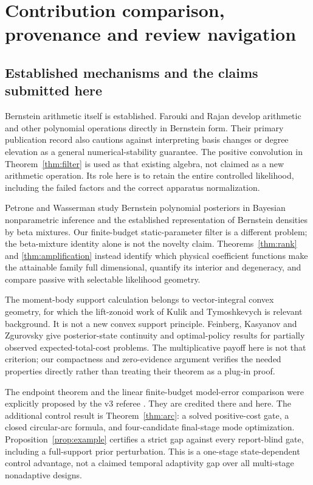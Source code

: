 \section{Contribution comparison, provenance and review navigation}\label{app:comparison}
\subsection{Established mechanisms and the claims submitted here}
Bernstein arithmetic itself is established. Farouki and Rajan \cite{FaroukiRajan} develop arithmetic and other polynomial operations directly in Bernstein form. Their primary publication record also cautions against interpreting basis changes or degree elevation as a general numerical-stability guarantee. The positive convolution in Theorem~\ref{thm:filter} is used as that existing algebra, not claimed as a new arithmetic operation. Its role here is to retain the entire controlled likelihood, including the failed factors and the correct apparatus normalization.

Petrone and Wasserman \cite{PetroneWasserman} study Bernstein polynomial posteriors in Bayesian nonparametric inference and the established representation of Bernstein densities by beta mixtures. Our finite-budget static-parameter filter is a different problem; the beta-mixture identity alone is not the novelty claim. Theorems~\ref{thm:rank} and \ref{thm:amplification} instead identify which physical coefficient functions make the attainable family full dimensional, quantify its interior and degeneracy, and compare passive with selectable likelihood geometry.

The moment-body support calculation belongs to vector-integral convex geometry, for which the lift-zonoid work of Kulik and Tymoshkevych \cite{KulikTymoshkevych} is relevant background. It is not a new convex support principle. Feinberg, Kasyanov and Zgurovsky \cite{FeinbergEtAl} give posterior-state continuity and optimal-policy results for partially observed expected-total-cost problems. The multiplicative payoff here is not that criterion; our compactness and zero-evidence argument verifies the needed properties directly rather than treating their theorem as a plug-in proof.

The endpoint theorem and the linear finite-budget model-error comparison were explicitly proposed by the v3 referee \cite{RefereeV3}. They are credited there and here. The additional control result is Theorem~\ref{thm:arc}: a solved positive-cost gate, a closed circular-arc formula, and four-candidate final-stage mode optimization. Proposition~\ref{prop:example} certifies a strict gap against every report-blind gate, including a full-support prior perturbation. This is a one-stage state-dependent control advantage, not a claimed temporal adaptivity gap over all multi-stage nonadaptive designs.

